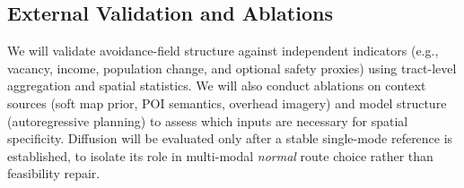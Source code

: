 \subsection{External Validation and Ablations}
We will validate avoidance-field structure against independent indicators (e.g., vacancy, income, population change, and optional safety proxies) using tract-level aggregation and spatial statistics. We will also conduct ablations on context sources (soft map prior, POI semantics, overhead imagery) and model structure (autoregressive planning) to assess which inputs are necessary for spatial specificity. Diffusion will be evaluated only after a stable single-mode reference is established, to isolate its role in multi-modal \emph{normal} route choice rather than feasibility repair.
